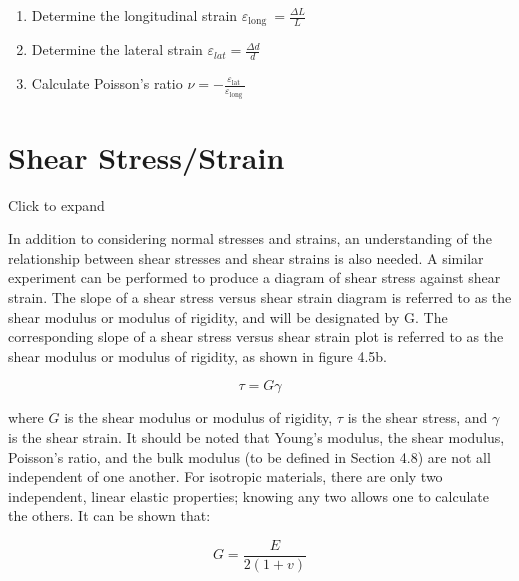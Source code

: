 \documentclass[
  letterpaper,
  DIV=11,
  numbers=noendperiod]{scrreprt}
\begin{document}
\begin{tcolorbox}[enhanced jigsaw, breakable, opacityback=0, toptitle=1mm, left=2mm, colback=white, opacitybacktitle=0.6, colframe=quarto-callout-warning-color-frame, titlerule=0mm, arc=.35mm, leftrule=.75mm, bottomtitle=1mm, colbacktitle=quarto-callout-warning-color!10!white, rightrule=.15mm, title={Step-by-step:}, bottomrule=.15mm, toprule=.15mm, coltitle=black]

\begin{enumerate}
\def\labelenumi{\arabic{enumi}.}
\item
  Determine the longitudinal strain
  \(\varepsilon_{\text {long }}=\frac{\Delta L}{L}\)
\item
  Determine the lateral strain
  \(\varepsilon_{l a t}=\frac{\Delta d}{d}\)
\item
  Calculate Poisson's ratio
  \(\nu=-\frac{\varepsilon_{\text {lat }}}{\varepsilon_{\text {long }}}\)
\end{enumerate}

\end{tcolorbox}

\section{Shear Stress/Strain}\label{sec-4.5}

Click to expand

In addition to considering normal stresses and strains, an understanding
of the relationship between shear stresses and shear strains is also
needed. A similar experiment can be performed to produce a diagram of
shear stress against shear strain. The slope of a shear stress versus
shear strain diagram is referred to as the shear modulus or modulus of
rigidity, and will be designated by G. The corresponding slope of a
shear stress versus shear strain plot is referred to as the shear
modulus or modulus of rigidity, as shown in figure 4.5b.

\[
\tau=G \gamma
\]

where \(G\) is the shear modulus or modulus of rigidity, \(\tau\) is the
shear stress, and \(\gamma\) is the shear strain. It should be noted
that Young's modulus, the shear modulus, Poisson's ratio, and the bulk
modulus (to be defined in Section 4.8) are not all independent of one
another. For isotropic materials, there are only two independent, linear
elastic properties; knowing any two allows one to calculate the others.
It can be shown that:

\[
G=\frac{E}{2(1+v)}
\]
\end{document}
